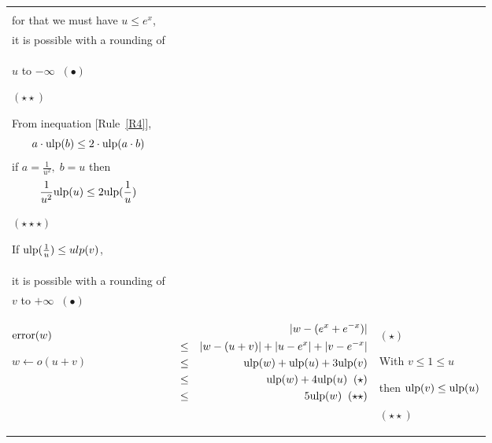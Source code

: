 \documentclass[12pt]{amsart}
\def\ulp{{\rm ulp}}
\newcommand{\U}[1]{\quad \mbox{[Rule~\ref{#1}]}}
\begin{document}
\begin{center}
\begin{tabular}{l|l |l}
\begin{minipage}{7.5cm}
\end{minipage} &
\begin{minipage}{6cm}

$(\star)$

With $\frac{1}{e^x} \leq \frac{1}{u}$,\\ 
for that we must have $u \leq e^x$,\\
it is possible with a rounding of\\
$u$ to $-\infty \;\; (\bullet)$

$(\star\star)$

From inequation \U{R4}, 
\[   a \cdot \ulp(b) \leq 2 \cdot \ulp(a \cdot b)\]
if $a =\frac{1}{u^2},\;b = u$ then  
\[ \frac{1}{u^2} \ulp(u)  \leq 2 \ulp(\frac{1}{u})\]

$(\star\star\star)$

If $\ulp(\frac{1}{u}) \leq ulp(v)$,\\
it is possible with a rounding of \\
$v$ to $+\infty \;\; (\bullet)$\\



\end{minipage}\\\hline
\begin{minipage}{2.5cm}
${\textnormal{error}}(w)$


$w \leftarrow o(u+v) $
\end{minipage} &
\begin{minipage}{7.5cm}



\begin{eqnarray}\nonumber
  &&|w-(e^{x}+e^{-x})| \\\nonumber
  &       \leq&  |w - (u+v)|+|u - e^x|+|v - e^{-x}|\\\nonumber
  &       \leq& \ulp(w) + \ulp(u) + 3\ulp(v)\\\nonumber
  &       \leq& \ulp(w) + 4\ulp(u)\;\;(\star)\\\nonumber
  &       \leq& 5\ulp(w)\;\;(\star\star)\\\nonumber
\end{eqnarray}


\end{minipage} &
\begin{minipage}{6cm}

$(\star)$

With $v \leq 1\leq u$ 

then $\ulp(v) \leq \ulp(u)$

$(\star\star)$


\end{minipage}
\end{tabular}
\end{center}
\end{document}
